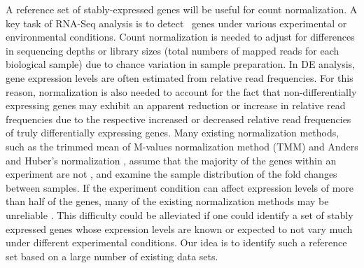 A reference set of stably-expressed genes will be useful for count
normalization.  A key task of RNA-Seq analysis is to detect \DED~genes under
various experimental or environmental conditions. Count normalization is
needed to adjust for differences in sequencing depths or library sizes (total
numbers of mapped reads for each biological sample) due to chance variation in
sample preparation.  In DE analysis, gene expression levels are often
estimated from relative read frequencies. For this reason, normalization is also 
needed to account for the fact that non-differentially expressing genes may exhibit
an apparent reduction or increase in relative read frequencies due to the respective 
increased or decreased relative read frequencies of truly differentially expressing genes.
Many existing normalization methods, such as the trimmed
mean of M-values normalization method (TMM) \citep{robinson2010scaling} and
Anders and Huber's normalization \citep{anders2010differential}, assume that the
majority of the genes within an experiment are not \DED, and examine the sample
distribution of the fold changes between samples.
If the experiment condition can affect expression levels of more than half of
the genes, many of the existing normalization methods may be unreliable
\citep{loven2012revisiting, wu2013use}.  This difficulty could be
alleviated if one could identify a set of stably expressed genes whose
expression levels are known or expected to not vary much under different
experimental conditions. Our idea is to identify such a reference set based on
a large number of existing data sets.

